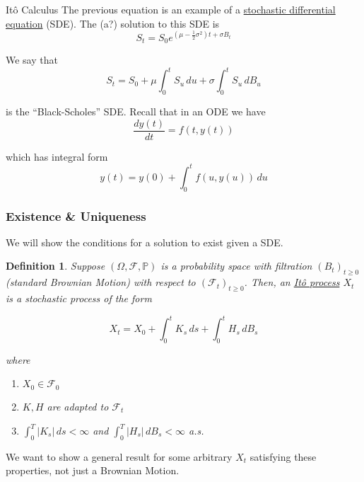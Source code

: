 \documentclass[12pt]{article}
\newtheorem{definition}{Definition}
\newlength\tindent
\renewcommand{\indent}{\hspace*{\tindent}}
\begin{document}
\begin{section}{It\^{o} Calculus}
\indent The previous equation is an example of a \underline{stochastic differential equation} (SDE). The (a?) solution to this SDE is
\begin{equation*}
	S_t = S_0 e^{(\mu - \frac{1}{2}\sigma^2)t + \sigma B_t}
\end{equation*}

We say that
\begin{equation*}
	S_t = S_0 + \mu\int^t_0S_u\,du + \sigma\int^t_0S_u\,dB_u
\end{equation*}

is the ``Black-Scholes'' SDE. Recall that in an ODE we have
\begin{equation*}
	\frac{dy(t)}{dt} = f(t,y(t))
\end{equation*}

which has integral form
\begin{equation*}
	y(t) = y(0) + \int^t_0f(u,y(u))\,du
\end{equation*}

\subsubsection{Existence \& Uniqueness}

We will show the conditions for a solution to exist given a SDE.

\begin{definition} Suppose $(\Omega, \mathcal F, \mathbb P)$ is a probability space with filtration $(B_t)_{t\geq0}$ (standard Brownian Motion) with respect to $(\mathcal F_t)_{t\geq0}$. Then, an \underline{It\^{o} process} $X_t$ is a stochastic process of the form

\begin{equation*}
	X_t = X_0 + \int^t_0 K_s\,ds + \int^t_0 H_s\,dB_s
\end{equation*}

where
\begin{enumerate}
	\item $X_0 \in \mathcal F_0$
	\item $K, H$ are adapted to $\mathcal F_t$ 
	\item $\int^T_0|K_s|\,ds < \infty$ and $\int^T_0|H_s|\,dB_s < \infty$ a.s.
\end{enumerate}
\end{definition}

\indent We want to show a general result for some arbitrary $X_t$ satisfying these properties, not just a Brownian Motion.


\end{section}
\end{document}
